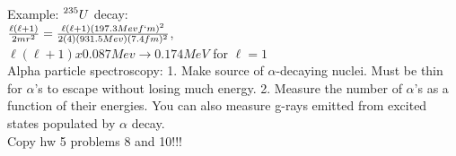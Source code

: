 \documentclass{article}
\begin{document}
\begin{multicols}{3}
Example: $\prescript{235}{}{U}$ decay:\\
 $\frac{\ell(\ell+1)}{2mr^{2}} = \frac{\ell(\ell+1)(197.3Mev f`m)^{2}}{2(4)(931.5Mev)(7.4fm)^{2}}$,\\ $\ell(\ell+1)x0.087Mev \rightarrow 0.174MeV$ for $\ell = 1$\\
 Alpha particle spectroscopy: 1. Make source of $\alpha$-decaying nuclei.  Must be thin for $\alpha$'s to escape without losing much energy.  2. Measure the number of $\alpha$'s as a function of their energies.  You can also measure g-rays emitted from excited states populated by $\alpha$ decay.\\

Copy hw 5 problems 8 and 10!!!\\


\end{multicols}
 
\end{document}
